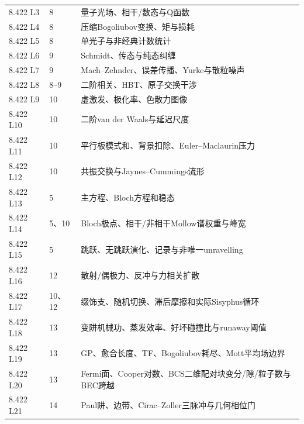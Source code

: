\begin{longtable}{p{.15\linewidth}p{.13\linewidth}p{.62\linewidth}}
8.422 L3 & 8 & 量子光场、相干/数态与Q函数\\
8.422 L4 & 8 & 压缩Bogoliubov变换、矩与损耗\\
8.422 L5 & 8 & 单光子与非经典计数统计\\
8.422 L6 & 9 & Schmidt、传态与纯态纠缠\\
8.422 L7 & 9 & Mach--Zehnder、误差传播、Yurke与散粒噪声\\
8.422 L8 & 8–9 & 二阶相关、HBT、原子交换干涉\\
8.422 L9 & 10 & 虚激发、极化率、色散力图像\\
8.422 L10 & 10 & 二阶van der Waals与延迟尺度\\
8.422 L11 & 10 & 平行板模式和、背景扣除、Euler--Maclaurin压力\\
8.422 L12 & 10 & 共振交换与Jaynes--Cummings流形\\
8.422 L13 & 5 & 主方程、Bloch方程和稳态\\
8.422 L14 & 5、10 & Bloch极点、相干/非相干Mollow谱权重与峰宽\\
8.422 L15 & 5 & 跳跃、无跳跃演化、记录与非唯一unravelling\\
8.422 L16 & 12 & 散射/偶极力、反冲与力相关扩散\\
8.422 L17 & 10、12 & 缀饰支、随机切换、滞后摩擦和实际Sisyphus循环\\
8.422 L18 & 13 & 变阱机械功、蒸发效率、好坏碰撞比与runaway阈值\\
8.422 L19 & 13 & GP、愈合长度、TF、Bogoliubov耗尽、Mott平均场边界\\
8.422 L20 & 13 & Fermi面、Cooper对数、BCS二维配对块变分/隙/粒子数与BEC跨越\\
8.422 L21 & 14 & Paul阱、边带、Cirac--Zoller三脉冲与几何相位门\\
\bottomrule\end{longtable}
